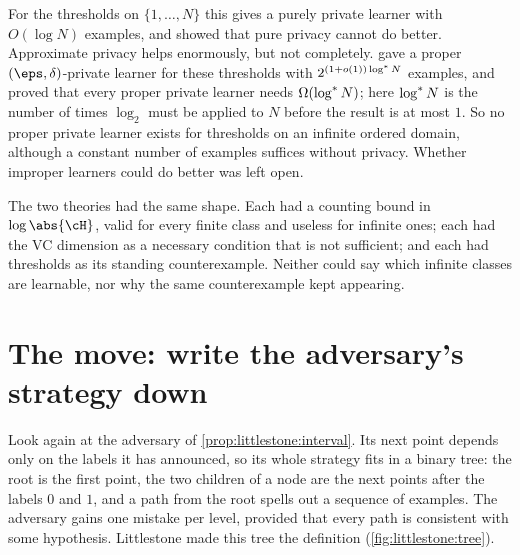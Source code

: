 \begin{refsection}
For the thresholds on $\{1,\dots,N\}$ this gives a purely private learner with $O(\log N)$ examples, and \textcite{FeldmanXiao2015} showed that pure privacy cannot do better. Approximate privacy helps enormously, but not completely. \Textcite{BunNissimStemmerVadhan2015} gave a proper $(\eps,\delta)$-private learner for these thresholds with $2^{(1+o(1))\log^{*} N}$ examples, and proved that every proper private learner needs $\Omega(\log^{*} N)$; here $\log^{*} N$ is the number of times $\log_2$ must be applied to $N$ before the result is at most $1$. So no proper private learner exists for thresholds on an infinite ordered domain, although a constant number of examples suffices without privacy. Whether improper learners could do better was left open.

The two theories had the same shape. Each had a counting bound in $\log\abs{\cH}$, valid for every finite class and useless for infinite ones; each had the VC dimension as a necessary condition that is not sufficient; and each had thresholds as its standing counterexample. Neither could say which infinite classes are learnable, nor why the same counterexample kept appearing.

\section{The move: write the adversary's strategy down}\label{sec:littlestone:move}

Look again at the adversary of \cref{prop:littlestone:interval}. Its next point depends only on the labels it has announced, so its whole strategy fits in a binary tree: the root is the first point, the two children of a node are the next points after the labels $0$ and $1$, and a path from the root spells out a sequence of examples. The adversary gains one mistake per level, provided that every path is consistent with some hypothesis. Littlestone made this tree the definition (\cref{fig:littlestone:tree}).


\end{refsection}
